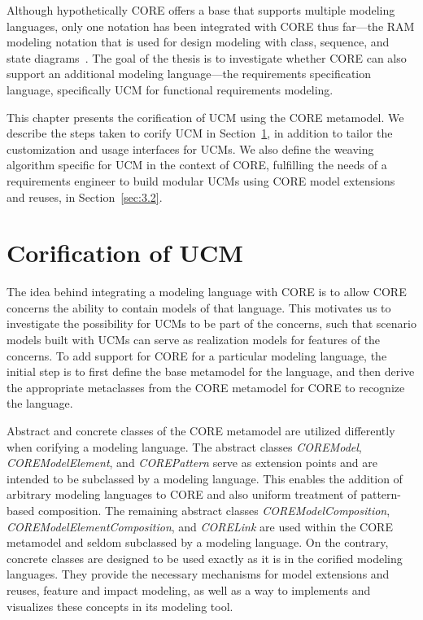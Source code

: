 
Although hypothetically CORE offers a base that supports multiple modeling languages, only one notation has been integrated with CORE thus far---the RAM modeling notation that is used for design modeling with class, sequence, and state diagrams~\cite{kienzle2010aspect, klein2007reusable}. The goal of the thesis is to investigate whether CORE can also support an additional modeling language---the requirements specification language, specifically UCM for functional requirements modeling.

This chapter presents the corification of UCM using the CORE metamodel. We describe the steps taken to corify UCM in Section~\ref{sec:3.1}, in addition to tailor the customization and usage interfaces for UCMs. We also define the weaving algorithm specific for UCM in the context of CORE, fulfilling the needs of a requirements engineer to build modular UCMs using CORE model extensions and reuses, in Section~\ref{sec:3.2}.

\section{Corification of UCM} \label{sec:3.1}

The idea behind integrating a modeling language with CORE is to allow CORE concerns the ability to contain models of that language. This motivates us to investigate the possibility for UCMs to be part of the concerns, such that scenario models built with UCMs can serve as realization models for features of the concerns. To add support for CORE for a particular modeling language, the initial step is to first define the base metamodel for the language, and then derive the appropriate metaclasses from the CORE metamodel for CORE to recognize the language.

Abstract and concrete classes of the CORE metamodel are utilized differently when corifying a modeling language. The abstract classes \textit{\cls COREModel}, \textit{\cls COREModelElement}, and \textit{\cls COREPattern} serve as extension points and are intended to be subclassed by a modeling language. This enables the addition of arbitrary modeling languages to CORE and also uniform treatment of pattern-based composition. The remaining abstract classes \textit{\cls COREModelComposition}, \textit{\cls COREModelElementComposition}, and \textit{\cls CORELink} are used within the CORE metamodel and seldom subclassed by a modeling language. On the contrary, concrete classes are designed to be used exactly as it is in the corified modeling languages. They provide the necessary mechanisms for model extensions and reuses, feature and impact modeling, as well as a way to implements and visualizes these concepts in its modeling tool.

